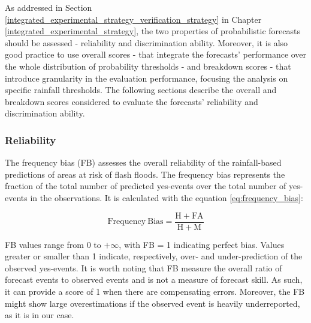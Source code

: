As addressed in Section \ref{integrated_experimental_strategy_verification_strategy} in Chapter \ref{integrated_experimental_strategy}, the two properties of probabilistic forecasts should be assessed - reliability and discrimination ability. Moreover, it is also good practice to use overall scores - that integrate the forecasts' performance over the whole distribution of probability thresholds - and breakdown scores - that introduce granularity in the evaluation performance, focusing the analysis on specific rainfall thresholds. The following sections describe the overall and breakdown scores considered to evaluate the forecasts' reliability and discrimination ability.

\subsubsection{Reliability}
The  frequency bias (FB) assesses the overall reliability of the rainfall-based predictions of areas at risk of flash floods. The frequency bias represents the fraction of the total number of predicted yes-events over the total number of yes-events in the observations. It is calculated with the equation \ref{eq:frequency_bias}:

\begin{equation}
\mathrm{Frequency\ Bias} = \frac{\mathrm{H} + \mathrm{FA}}{\mathrm{H} + \mathrm{M}}
\label{eq:frequency_bias}
\end{equation}

\noindent FB values range from 0 to $+\infty$, with FB = 1 indicating perfect bias. Values greater or smaller than 1 indicate, respectively, over- and under-prediction of the observed yes-events. It is worth noting that FB measure the overall ratio of forecast events to observed events and is not a measure of forecast skill. As such, it can provide a score of 1 when there are compensating errors. Moreover, the FB might show large overestimations if the observed event is heavily underreported, as it is in our case.

